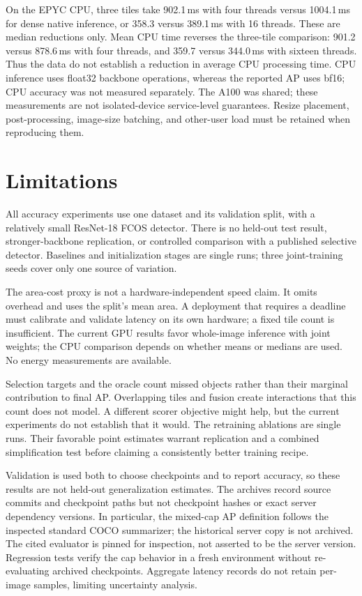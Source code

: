 \documentclass[conference]{IEEEtran}
\begin{document}
On the EPYC CPU, three tiles take 902.1\,ms with four threads versus 1004.1\,ms for dense native inference, or 358.3 versus 389.1\,ms with 16 threads. These are median reductions only. Mean CPU time reverses the three-tile comparison: 901.2 versus 878.6\,ms with four threads, and 359.7 versus 344.0\,ms with sixteen threads. Thus the data do not establish a reduction in average CPU processing time. CPU inference uses float32 backbone operations, whereas the reported AP uses bf16; CPU accuracy was not measured separately. The A100 was shared; these measurements are not isolated-device service-level guarantees. Resize placement, post-processing, image-size batching, and other-user load must be retained when reproducing them.

\section{Limitations}
\label{sec:limitations}
All accuracy experiments use one dataset and its validation split, with a relatively small ResNet-18 FCOS detector. There is no held-out test result, stronger-backbone replication, or controlled comparison with a published selective detector. Baselines and initialization stages are single runs; three joint-training seeds cover only one source of variation.

The area-cost proxy is not a hardware-independent speed claim. It omits overhead and uses the split's mean area. A deployment that requires a deadline must calibrate and validate latency on its own hardware; a fixed tile count is insufficient. The current GPU results favor whole-image inference with joint weights; the CPU comparison depends on whether means or medians are used. No energy measurements are available.

Selection targets and the oracle count missed objects rather than their marginal contribution to final AP. Overlapping tiles and fusion create interactions that this count does not model. A different scorer objective might help, but the current experiments do not establish that it would. The retraining ablations are single runs. Their favorable point estimates warrant replication and a combined simplification test before claiming a consistently better training recipe.

Validation is used both to choose checkpoints and to report accuracy, so these results are not held-out generalization estimates. The archives record source commits and checkpoint paths but not checkpoint hashes or exact server dependency versions. In particular, the mixed-cap AP definition follows the inspected standard COCO summarizer; the historical server copy is not archived. The cited evaluator is pinned for inspection, not asserted to be the server version. Regression tests verify the cap behavior in a fresh environment without re-evaluating archived checkpoints. Aggregate latency records do not retain per-image samples, limiting uncertainty analysis.
\end{document}
